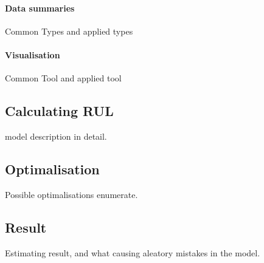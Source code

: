 		\paragraph{Data summaries}
		Common Types and applied types
		\paragraph{Visualisation}
		Common Tool and applied tool
	\subsection{Calculating RUL}
model description in detail.
	\subsection{Optimalisation}
Possible optimalisations enumerate.
	\subsection{Result}
Estimating result, and what causing aleatory mistakes in the model. 